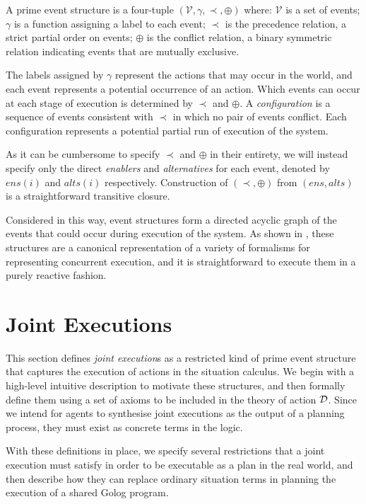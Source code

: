 \begin{defnL}
 A prime event structure is a
four-tuple $(\mathcal{V},\gamma,\prec,\oplus)$ where: $\mathcal{V}$
is a set of events; $\gamma$ is a function assigning a label to each
event; $\prec$ is the precedence relation, a strict partial order
on events; $\oplus$ is the conflict relation, a binary symmetric
relation indicating events that are mutually exclusive. 
\end{defnL}
The labels assigned by $\gamma$ represent the actions that may occur
in the world, and each event represents a potential occurrence of
an action. Which events can occur at each stage of execution is determined
by $\prec$ and $\oplus$. A \emph{configuration} is a sequence of
events consistent with $\prec$ in which no pair of events conflict.
Each configuration represents a potential partial run of execution
of the system.

As it can be cumbersome to specify $\prec$ and $\oplus$ in their
entirety, we will instead specify only the direct \emph{enablers}
and \emph{alternatives} for each event, denoted by $ens(i)$ and $alts(i)$
respectively. Construction of $(\prec,\oplus)$ from $(ens,alts)$
is a straightforward transitive closure.

Considered in this way, event structures form a directed acyclic graph
of the events that could occur during execution of the system. As
shown in \citep{pratt91modeling_conc_with_geom}, these structures
are a canonical representation of a variety of formalisms for representing
concurrent execution, and it is straightforward to execute them in
a purely reactive fashion.


\section{Joint Executions\label{sec:JointExec:JEs}}

This section defines \emph{joint execution}s as a restricted kind
of prime event structure that captures the execution of actions in
the situation calculus. We begin with a high-level intuitive description
to motivate these structures, and then formally define them using
a set of axioms to be included in the theory of action $\mathcal{D}$. Since
we intend for agents to synthesise joint executions as the output
of a planning process, they must exist as concrete terms in the logic.

With these definitions in place, we specify several restrictions that
a joint execution must satisfy in order to be executable as a plan
in the real world, and then describe how they can replace ordinary
situation terms in planning the execution of a shared Golog program.


